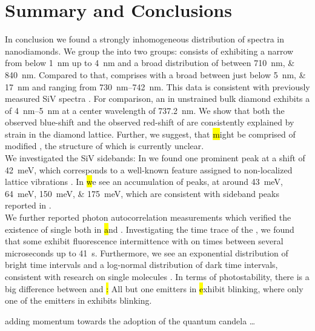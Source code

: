 

 \chapter*{Summary and Conclusions}	\label{ch::conclusion}


   In conclusion we found a strongly inhomogeneous distribution of \siv spectra in nanodiamonds.
   We group the \zpls into two groups:
   \Hl consists of \ZPLs exhibiting a narrow \lw from below \SI{1}{nm} up to \SI{4}{nm} and a broad distribution of \cwl between \SIlist{710;840}{nm}.
   Compared to that, \vl comprises \ZPLs with a broad \lw between just below \SIlist{5; 17}{nm} and \cwl ranging from \SIrange{730}{742}{nm}.
   This data is consistent with previously measured SiV spectra \cite{Benedikter2017a,Neu2012}.
   For comparison, an \siv in unstrained bulk diamond exhibits a \lw of \SIrange{4}{5}{nm} at a center wavelength of \SI{737.2}{nm}\cite{Arend2016a,Dietrich2014}.
   We show that both the observed blue-shift and the observed red-shift of \vl are consistently explained by strain in the diamond lattice.
   Further, we suggest, that \hl might be comprised of modified \sivs, the structure of which is currently unclear.
   \\
   We investigated the SiV sidebands:
   In \vl we found one prominent peak at a shift of \SI{42}{meV}, which corresponds to a well-known feature assigned to non-localized lattice vibrations \cite{Larkins1971,Sternschulte1994}.
   In \hl we see an accumulation of peaks, at around \SIlist{43;64;150;175}{meV}, which are consistent with sideband peaks reported in \cite{Sternschulte1994,Zaitsev2001,Neu2011}.
   \\
   We further reported photon autocorrelation measurements which verified the existence of single \sivs both in \hl and \vl.
   Investigating the time trace of the \siv \pl, we found that some \sivs exhibit fluorescence intermittence with on times between several microseconds up to \SI{41}{s}.
   Furthermore, we see an exponential distribution of bright time intervals and a log-normal distribution of dark time intervals, consistent with research on single molecules \cite{Wong2013}.
   In terms of photostability, there is a big difference between \vl and \hl:
   All but one emitters in \hl exhibit blinking, where only one of the emitters in \vl exhibits blinking.

   


   adding momentum towards the adoption of the quantum candela \dots
